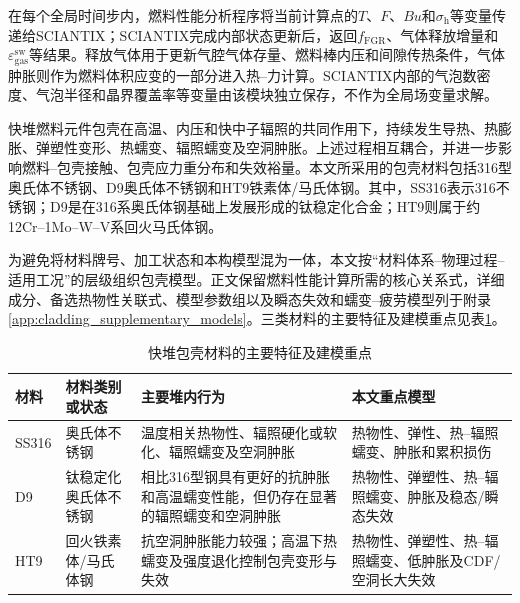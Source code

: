 在每个全局时间步内，燃料性能分析程序将当前计算点的$T$、$F$、$Bu$和$\sigma_{\mathrm{h}}$等变量传递给SCIANTIX；SCIANTIX完成内部状态更新后，返回$f_{\mathrm{FGR}}$、气体释放增量和$\varepsilon_{\mathrm{gas}}^{\mathrm{sw}}$等结果。释放气体用于更新气腔气体存量、燃料棒内压和间隙传热条件，气体肿胀则作为燃料体积应变的一部分进入热--力计算。SCIANTIX内部的气泡数密度、气泡半径和晶界覆盖率等变量由该模块独立保存，不作为全局场变量求解。


\label{sec:cladding_incore_models}

快堆燃料元件包壳在高温、内压和快中子辐照的共同作用下，持续发生导热、热膨胀、弹塑性变形、热蠕变、辐照蠕变及空洞肿胀。上述过程相互耦合，并进一步影响燃料--包壳接触、包壳应力重分布和失效裕量。本文所采用的包壳材料包括316型奥氏体不锈钢、D9奥氏体不锈钢和HT9铁素体/马氏体钢。其中，SS316表示316不锈钢；D9是在316系奥氏体钢基础上发展形成的钛稳定化合金；HT9则属于约12Cr--1Mo--W--V系回火马氏体钢\cite{hofmanMetallicFuelsHandbook2019,halesBISONTheoryManual2016}。

为避免将材料牌号、加工状态和本构模型混为一体，本文按“材料体系--物理过程--适用工况”的层级组织包壳模型。正文保留燃料性能计算所需的核心关系式，详细成分、备选热物性关联式、模型参数组以及瞬态失效和蠕变--疲劳模型列于附录\ref{app:cladding_supplementary_models}。三类材料的主要特征及建模重点见表\ref{tab:cladding_material_overview}。

\begin{table}[htbp]
	\centering
	\renewcommand{\arraystretch}{1.18}
	\caption{快堆包壳材料的主要特征及建模重点}
	\label{tab:cladding_material_overview}
	\begin{tabularx}{\textwidth}{p{2.1cm}p{3.0cm}X X}
		\toprule
		{\centering 材料\par} & {\centering 材料类别或状态\par} & {\centering 主要堆内行为\par} & {\centering 本文重点模型\par} \\
		\midrule
		SS316 & 奥氏体不锈钢 & 温度相关热物性、辐照硬化或软化、辐照蠕变及空洞肿胀 & 热物性、弹性、热--辐照蠕变、肿胀和累积损伤 \\
		D9 & 钛稳定化奥氏体不锈钢 & 相比316型钢具有更好的抗肿胀和高温蠕变性能，但仍存在显著的辐照蠕变和空洞肿胀 & 热物性、弹塑性、热--辐照蠕变、肿胀及稳态/瞬态失效 \\
		HT9 & 回火铁素体/马氏体钢 & 抗空洞肿胀能力较强；高温下热蠕变及强度退化控制包壳变形与失效 & 热物性、弹塑性、热--辐照蠕变、低肿胀及CDF/空洞长大失效 \\
		\bottomrule
	\end{tabularx}
\end{table}

